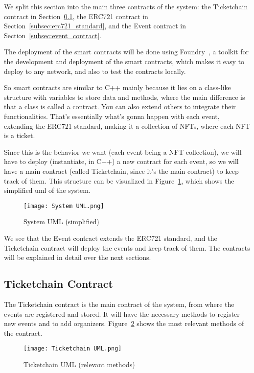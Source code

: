 We split this section into the main three contracts of the system: the
Ticketchain contract in Section~\ref{subsec:ticketchain_contract}, the ERC721
contract in Section~\ref{subsec:erc721_standard}, and the Event contract in
Section~\ref{subsec:event_contract}.

The deployment of the smart contracts will be done using
Foundry~\cite{foundry}, a toolkit for the development and deployment of the
smart contracts, which makes it easy to deploy to any network, and also to test
the contracts locally.

So smart contracts are similar to C++ mainly because it lies on a class-like
structure with variables to store data and methods, where the main difference
is that a class is called a contract. You can also extend others to integrate
their functionalities. That's essentially what's gonna happen with each event,
extending the ERC721 standard, making it a collection of NFTs, where each NFT
is a ticket.

Since this is the behavior we want (each event being a NFT collection), we will
have to deploy (instantiate, in C++) a new contract for each event, so we will
have a main contract (called Ticketchain, since it's the main contract) to keep
track of them. This structure can be visualized in Figure~\ref{fig:system_uml},
which shows the simplified \gls{uml} of the system.

\begin{figure}[H]
	\texttt{[image: System UML.png]}
	\centering
	\caption{System UML (simplified)}\label{fig:system_uml}
\end{figure}

We see that the Event contract extends the ERC721 standard, and the Ticketchain
contract will deploy the events and keep track of them. The contracts will be
explained in detail over the next sections.

\subsection{Ticketchain Contract}\label{subsec:ticketchain_contract}

The Ticketchain contract is the main contract of the system, from where the
events are registered and stored. It will have the necessary methods to
register new events and to add organizers. Figure~\ref{fig:ticketchain_uml}
shows the most relevant methods of the contract.

\begin{figure}[H]
	\texttt{[image: Ticketchain UML.png]}
	\centering
	\caption{Ticketchain UML (relevant methods)}\label{fig:ticketchain_uml}
\end{figure}

